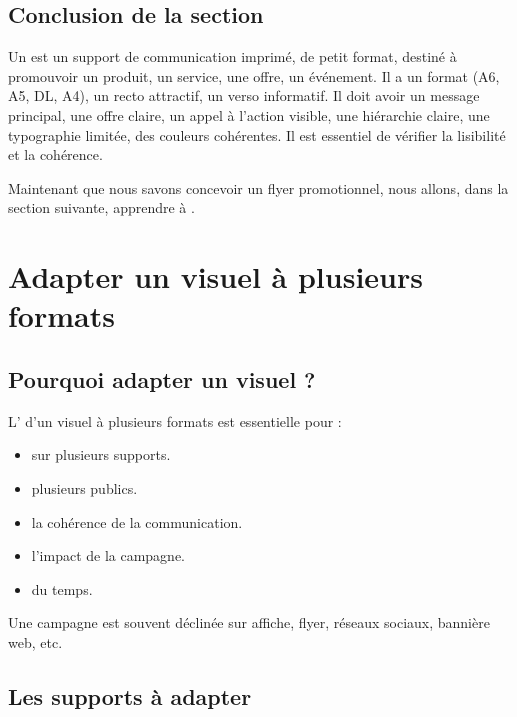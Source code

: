 \subsection*{Conclusion de la section}

Un  est un support de communication imprimé, de petit format, destiné à promouvoir un produit, un service, une offre, un événement. Il a un format (A6, A5, DL, A4), un recto attractif, un verso informatif. Il doit avoir un message principal, une offre claire, un appel à l'action visible, une hiérarchie claire, une typographie limitée, des couleurs cohérentes. Il est essentiel de vérifier la lisibilité et la cohérence.

Maintenant que nous savons concevoir un flyer promotionnel, nous allons, dans la section suivante, apprendre à .

\section{Adapter un visuel à plusieurs formats}

\subsection{Pourquoi adapter un visuel ?}

L' d'un visuel à plusieurs formats est essentielle pour :

\begin{itemize}
    \item {} sur plusieurs supports.
    \item {} plusieurs publics.
    \item {} la cohérence de la communication.
    \item {} l'impact de la campagne.
    \item {} du temps.
\end{itemize}

Une campagne est souvent déclinée sur affiche, flyer, réseaux sociaux, bannière web, etc.

\subsection{Les supports à adapter}

